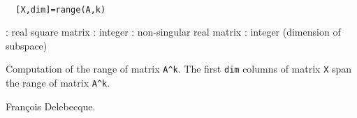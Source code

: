 
\begin{mandesc}
   \\ %
\end{mandesc}
\begin{calling_sequence}
\begin{verbatim}
  [X,dim]=range(A,k)  
\end{verbatim}
\end{calling_sequence}
\begin{parameters}
  \begin{varlist}
    : real square matrix
    : integer
    : non-singular real matrix
    : integer (dimension of subspace)
  \end{varlist}
\end{parameters}
\begin{mandescription}
  Computation of the range of matrix \verb!A^k!. The first \verb+dim+ columns of matrix 
  \verb!X! span the range of matrix \verb!A^k!.
\end{mandescription}
\begin{manseealso}
     
\end{manseealso}
\begin{authors}
  Fran\c{c}ois Delebecque.
\end{authors}
